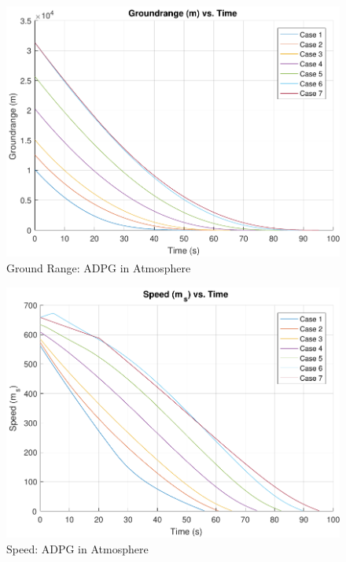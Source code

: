 \begin{figure}[H]
	\centering
	\begin{minipage}{4.5 in}
		\includegraphics[width=\linewidth]{Figures/rngpowatmo.pdf}
		\caption{Ground Range: ADPG in Atmosphere \label{fig:rngpowatmo} }
	\end{minipage}
\end{figure}

\begin{figure}[H]
	\centering
	\begin{minipage}{4.5 in}
		\includegraphics[width=\linewidth]{Figures/spdpowatmo.pdf}
		\caption{Speed: ADPG in Atmosphere \label{fig:spdpowatmo} }
	\end{minipage}
\end{figure}

